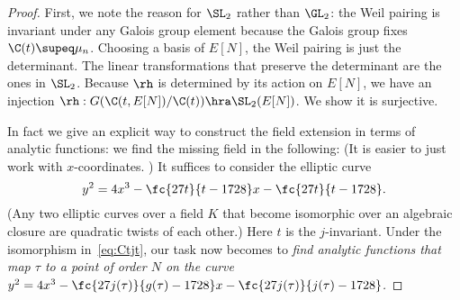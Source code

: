 \begin{proof}
First, we note the reason for $\SL_2$ rather than $\GL_2$: the Weil pairing is invariant under any Galois group element because the Galois group fixes $\C(t)\supeq \mu_n$. Choosing a basis of $E[N]$, the Weil pairing is just the determinant. The linear transformations that preserve the determinant are the ones in $\SL_2$. Because $\rh$ is determined by its action on $E[N]$, we have an injection $\rh: G(\C(t,E[N])/\C(t))\hra \SL_2(E[N])$. We show it is surjective.

In fact we give an explicit way to construct the field extension in terms of analytic functions: we find the missing field in the following:
\eeq
(It is easier to just work with $x$-coordinates. )
It suffices to consider the elliptic curve
\[
y^2=4x^3-\fc{27t}{t-1728}x-\fc{27t}{t-1728}.
\]
(Any two elliptic curves over a field $K$ that become isomorphic over an algebraic closure are quadratic twists of each other.)
Here $t$ is the $j$-invariant. 
Under the isomorphism in~\eqref{eq:Ctjt}, our task now becomes to {\it find analytic functions that map $\tau$ to a point of order $N$ on the curve $y^2=4x^3-\fc{27j(\tau)}{g(\tau)-1728}x-\fc{27j(\tau)}{j(\tau)-1728}$.}


\end{proof}
